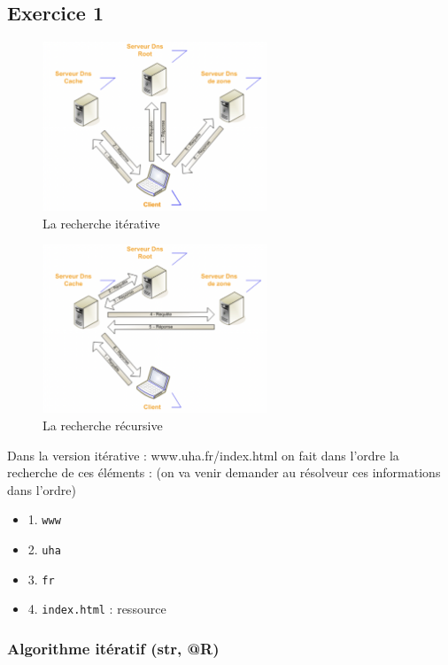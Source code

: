 \documentclass[12pt, a4paper]{article}
\begin{document}
    \subsection{Exercice 1}
    \begin{figure}[H]
        \centering
        \includegraphics[width=0.6\textwidth]{img/iteratif.png}
        \caption{La recherche itérative}
        \label{fig:iteratif}
    \end{figure}
    \begin{figure}[H]
        \centering
        \includegraphics[width=0.6\textwidth]{img/recursif.png}
        \caption{La recherche récursive}
        \label{fig:recursif}
    \end{figure}
\newpage
Dans la version itérative : www.uha.fr/index.html on fait dans l'ordre la 
recherche de ces éléments : (on va venir demander au résolveur ces informations
dans l'ordre)
\begin{itemize}
    \item 1. \texttt{www} 
    \item 2. \texttt{uha} 
    \item 3. \texttt{fr} 
    \item 4. \texttt{index.html} : ressource
\end{itemize}
    \subsubsection{Algorithme itératif (str, @R)}
\end{document}
